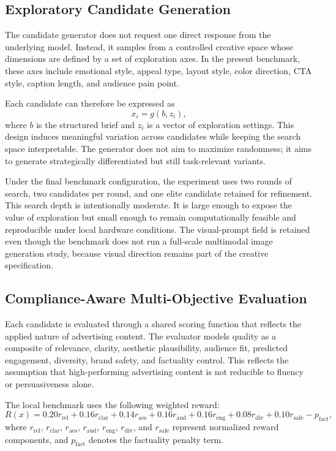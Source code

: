 \documentclass[applsci,article,submit,pdftex,moreauthors]{Definitions/mdpi}
\begin{document}
\subsection{Exploratory Candidate Generation}

The candidate generator does not request one direct response from the underlying model. Instead, it samples from a controlled creative space whose dimensions are defined by a set of exploration axes. In the present benchmark, these axes include emotional style, appeal type, layout style, color direction, CTA style, caption length, and audience pain point.

Each candidate can therefore be expressed as
\begin{equation}
x_i = g(b, z_i),
\end{equation}
where $b$ is the structured brief and $z_i$ is a vector of exploration settings. This design induces meaningful variation across candidates while keeping the search space interpretable. The generator does not aim to maximize randomness; it aims to generate strategically differentiated but still task-relevant variants.

Under the final benchmark configuration, the experiment uses two rounds of search, two candidates per round, and one elite candidate retained for refinement. This search depth is intentionally moderate. It is large enough to expose the value of exploration but small enough to remain computationally feasible and reproducible under local hardware conditions. The visual-prompt field is retained even though the benchmark does not run a full-scale multimodal image generation study, because visual direction remains part of the creative specification.

\subsection{Compliance-Aware Multi-Objective Evaluation}

Each candidate is evaluated through a shared scoring function that reflects the applied nature of advertising content. The evaluator models quality as a composite of relevance, clarity, aesthetic plausibility, audience fit, predicted engagement, diversity, brand safety, and factuality control. This reflects the assumption that high-performing advertising content is not reducible to fluency or persuasiveness alone.

The local benchmark uses the following weighted reward:
\begin{equation}
R(x) = 0.20r_{\mathrm{rel}} + 0.16r_{\mathrm{clar}} + 0.14r_{\mathrm{aes}} + 0.16r_{\mathrm{aud}} + 0.16r_{\mathrm{eng}} + 0.08r_{\mathrm{div}} + 0.10r_{\mathrm{safe}} - p_{\mathrm{fact}},
\end{equation}
where $r_{\mathrm{rel}}$, $r_{\mathrm{clar}}$, $r_{\mathrm{aes}}$, $r_{\mathrm{aud}}$, $r_{\mathrm{eng}}$, $r_{\mathrm{div}}$, and $r_{\mathrm{safe}}$ represent normalized reward components, and $p_{\mathrm{fact}}$ denotes the factuality penalty term.
\end{document}
